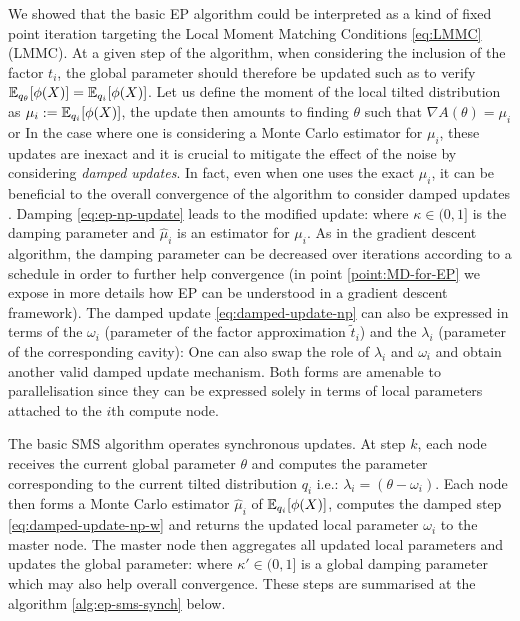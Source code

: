 We showed that the basic EP algorithm could be interpreted as a kind of fixed point iteration targeting the Local Moment Matching Conditions \eqref{eq:LMMC} (LMMC). At a given step of the algorithm, when considering the inclusion of the factor $t_i$, the global parameter should therefore be updated such as to verify $\mathbb E_{q_\theta}[\phi(X)]= \mathbb E_{q_i}[\phi(X)]$. Let us define the moment of the local tilted distribution as $\mu_i:=\mathbb E_{q_i}[\phi(X)]$, the update then amounts to finding $\theta$ such that $\nabla A(\theta) = \mu_i$ or
%
%
In the case where one is considering a Monte Carlo estimator for $\mu_i$, these updates are inexact and it is crucial to mitigate the effect of the noise by considering \emph{damped updates}. In fact, even when one uses the exact $\mu_i$, it can be beneficial to the overall convergence of the algorithm to consider damped updates \citep{heskes03}. Damping \eqref{eq:ep-np-update} leads to the modified update:
%
%
where $\kappa \in(0,1]$ is the damping parameter and $\hat\mu_i$ is an estimator for $\mu_i$. As in the gradient descent algorithm, the damping parameter can be decreased over iterations according to a schedule in order to further help convergence (in point \ref{point:MD-for-EP} we expose in more details how EP can be understood in a gradient descent framework).
The damped update \eqref{eq:damped-update-np} can also be expressed in terms of the $\omega_i$ (parameter of the factor approximation $\tilde t_i$) and the $\lambda_i$ (parameter of the corresponding cavity):
%
%
One can also swap the role of $\lambda_i$ and $\omega_i$ and obtain another valid damped update mechanism. Both forms are amenable to parallelisation since they can be expressed solely in terms of local parameters attached to the $i$th compute node.%

The basic SMS algorithm operates synchronous updates.
At step $k$, each node receives the current global parameter $\theta$ and computes the parameter corresponding to the current tilted distribution $q_i$ i.e.: $\lambda_i=(\theta-\omega_i)$. Each node then forms a Monte Carlo estimator $\hat\mu_i$ of $\mathbb E_{q_i}[\phi(X)]$, computes the damped step \eqref{eq:damped-update-np-w} and returns the updated local parameter $\omega_i$ to the master node. 
The master node then aggregates all updated local parameters and updates the global parameter: 
%
%
where $\kappa' \in (0,1]$ is a global damping parameter which may also help overall convergence. 
These steps are summarised at the algorithm \ref{alg:ep-sms-synch} below.

